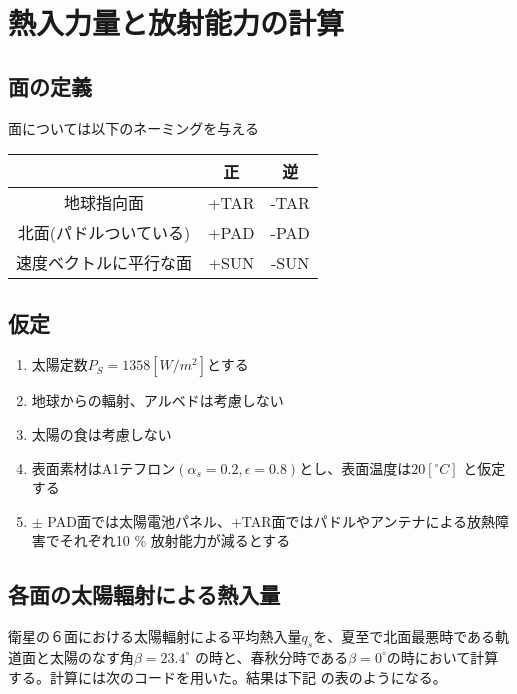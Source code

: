 \section{熱入力量と放射能力の計算}
\subsection{面の定義}
面については以下のネーミングを与える\par
\setlength{\parskip}{1.0\baselineskip}

\setlength{\tabcolsep}{.5zw}
\begin{tabularx}{40zw}{C|C C} \hline
   & 正 & 逆 \\ \hline
  地球指向面 & +TAR & -TAR \\ \hline
  北面(パドルついている) & +PAD & -PAD \\ \hline
  速度ベクトルに平行な面 & +SUN & -SUN \\ \hline
\end{tabularx}\par

\subsection{仮定}
\setlength{\parskip}{0\baselineskip}
\begin{enumerate}
  \item 太陽定数$P_S = 1358[W/m^2]$とする
  \item 地球からの輻射、アルベドは考慮しない
  \item 太陽の食は考慮しない
  \item 表面素材はA1テフロン$(\alpha _s = 0.2, \epsilon = 0.8)$とし、表面温度は$20[^ \circ C]$
  と仮定する
  \item $\pm$ PAD面では太陽電池パネル、+TAR面ではパドルやアンテナによる放熱障害でそれぞれ10 \%
  放射能力が減るとする
\end{enumerate}

\subsection{各面の太陽輻射による熱入量}
\setlength{\parskip}{0\baselineskip}
衛星の６面における太陽輻射による平均熱入量$q_s$を、夏至で北面最悪時である軌道面と太陽のなす角$\beta = 23.4 ^ \circ$
の時と、春秋分時である$\beta = 0 ^ \circ$の時において計算する。計算には次のコードを用いた。結果は下記
の表のようになる。\par
\setlength{\parskip}{1.0\baselineskip}


